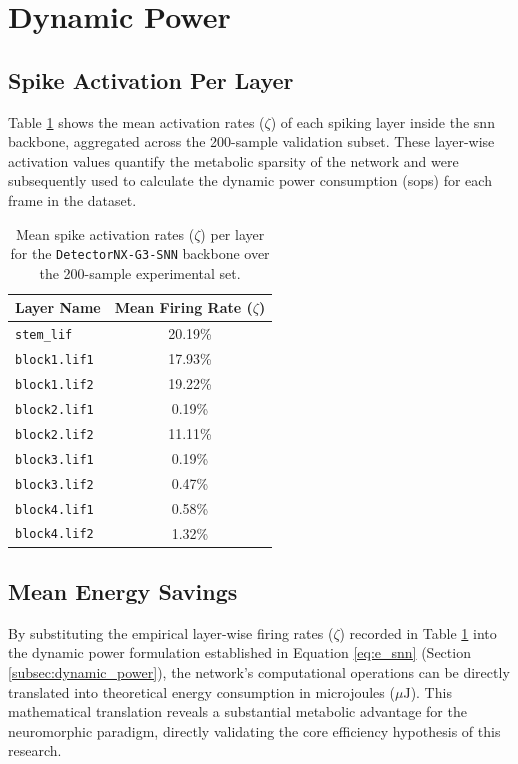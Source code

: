 \section{Dynamic Power}

\subsection*{Spike Activation Per Layer}

Table \ref{tab:spike_activation} shows the mean activation rates ($\zeta$) of each spiking layer inside the \gls{snn} backbone, aggregated across the 200-sample validation subset. 
These layer-wise activation values quantify the metabolic sparsity of the network and were subsequently used to calculate the dynamic power consumption (\glspl{sop}) for each frame in the dataset.

\begin{table}[htbp]
\centering
\begin{tabular}{|l|c|}
\hline
\textbf{Layer Name} & \textbf{Mean Firing Rate ($\zeta$)} \\
\hline
\texttt{stem\_lif} & 20.19\% \\
\texttt{block1.lif1} & 17.93\% \\
\texttt{block1.lif2} & 19.22\% \\
\texttt{block2.lif1} & 0.19\% \\
\texttt{block2.lif2} & 11.11\% \\
\texttt{block3.lif1} & 0.19\% \\
\texttt{block3.lif2} & 0.47\% \\
\texttt{block4.lif1} & 0.58\% \\
\texttt{block4.lif2} & 1.32\% \\
\hline
\end{tabular}
\caption[Layer-Wise Spike Activation Rates]{Mean spike activation rates ($\zeta$) per layer for the \texttt{DetectorNX-G3-SNN} backbone over the 200-sample experimental set.}
\label{tab:spike_activation}
\end{table}

\subsection*{Mean Energy Savings}
\label{subsubsec:mean_energy_savings}

By substituting the empirical layer-wise firing rates ($\zeta$) recorded in Table \ref{tab:spike_activation} into the dynamic power formulation established in Equation \ref{eq:e_snn} (Section \ref{subsec:dynamic_power}), the network's computational operations can be directly translated into theoretical energy consumption in microjoules ($\mu\text{J}$). This mathematical translation reveals a substantial metabolic advantage for the neuromorphic paradigm, directly validating the core efficiency hypothesis of this research.

